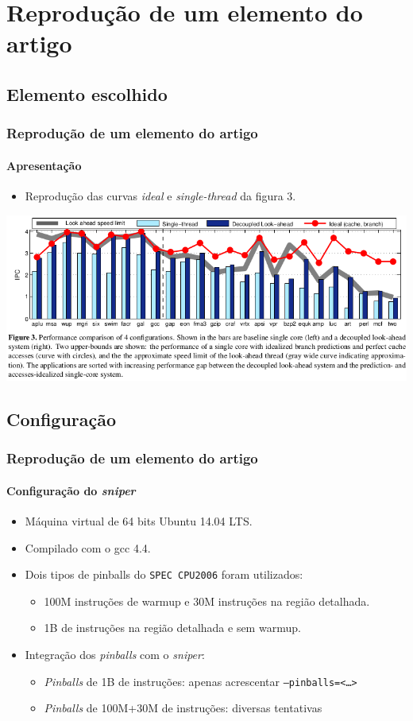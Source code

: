\documentclass[10pt]{beamer}
\begin{document}
\section{Reprodução de um elemento do artigo}
\subsection{Elemento escolhido} 
\begin {frame}
\frametitle{Reprodução de um elemento do artigo}
\framesubtitle{Apresentação}
\begin{itemize}
\item Reprodução das curvas \textit{ideal} e \textit{single-thread} da figura 3.
\end{itemize}

\vspace{16pt}
\centering
\includegraphics[width=1\textwidth]{images/fig3} 
\end{frame}

\subsection{Configuração}

\begin {frame}
\frametitle{Reprodução de um elemento do artigo}
\framesubtitle{Configuração do \textit{sniper}}
\begin{itemize}
\item Máquina virtual de 64 bits Ubuntu 14.04 LTS.
\item Compilado com o gcc 4.4.
\item Dois tipos de pinballs do \texttt{SPEC CPU2006} foram utilizados: 
\begin{itemize}
  \item 100M instruções de warmup e 30M instruções na região detalhada.
  \item 1B de instruções na região detalhada e sem warmup.
\end{itemize}

\item Integração dos \textit{pinballs} com o \textit{sniper}: 
\begin{itemize}
  \item \textit{Pinballs} de 1B de instruções: apenas acrescentar
  \texttt{--pinballs=<\ldots>}
  \item \textit{Pinballs} de 100M+30M de instruções: diversas tentativas
\end{itemize}
\end{itemize} 
\end{frame}
\end{document}
